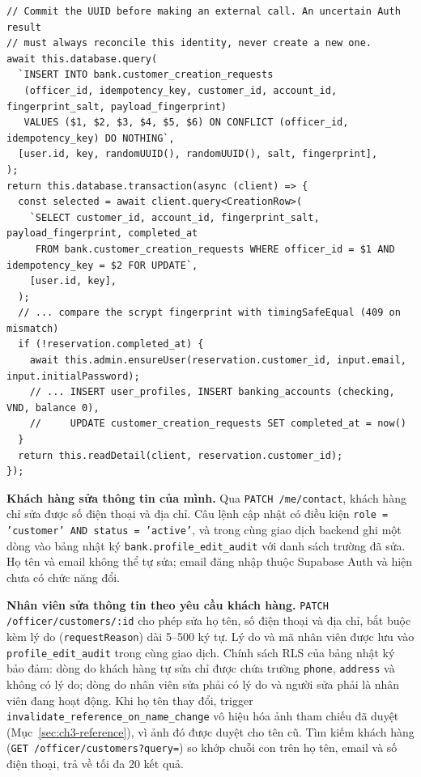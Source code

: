 \begin{lstlisting}[caption={Đặt chỗ yêu cầu tạo khách hàng trước khi gọi Supabase Auth (\texttt{customers.\allowbreak{}service.\allowbreak{}ts}, rút gọn)},label={lst:ch3-create}]
// Commit the UUID before making an external call. An uncertain Auth result
// must always reconcile this identity, never create a new one.
await this.database.query(
  `INSERT INTO bank.customer_creation_requests
   (officer_id, idempotency_key, customer_id, account_id, fingerprint_salt, payload_fingerprint)
   VALUES ($1, $2, $3, $4, $5, $6) ON CONFLICT (officer_id, idempotency_key) DO NOTHING`,
  [user.id, key, randomUUID(), randomUUID(), salt, fingerprint],
);
return this.database.transaction(async (client) => {
  const selected = await client.query<CreationRow>(
    `SELECT customer_id, account_id, fingerprint_salt, payload_fingerprint, completed_at
     FROM bank.customer_creation_requests WHERE officer_id = $1 AND idempotency_key = $2 FOR UPDATE`,
    [user.id, key],
  );
  // ... compare the scrypt fingerprint with timingSafeEqual (409 on mismatch)
  if (!reservation.completed_at) {
    await this.admin.ensureUser(reservation.customer_id, input.email, input.initialPassword);
    // ... INSERT user_profiles, INSERT banking_accounts (checking, VND, balance 0),
    //     UPDATE customer_creation_requests SET completed_at = now()
  }
  return this.readDetail(client, reservation.customer_id);
});
\end{lstlisting}

\textbf{Khách hàng sửa thông tin của mình.} Qua \texttt{PATCH /\allowbreak{}me/\allowbreak{}contact}, khách hàng chỉ sửa được số điện thoại và địa chỉ. Câu lệnh cập nhật có điều kiện \texttt{role = 'customer' AND status = 'active'}, và trong cùng giao dịch backend ghi một dòng vào bảng nhật ký \texttt{bank.\allowbreak{}profile\_\allowbreak{}edit\_\allowbreak{}audit} với danh sách trường đã sửa. Họ tên và email không thể tự sửa; email đăng nhập thuộc Supabase Auth và hiện chưa có chức năng đổi.

\textbf{Nhân viên sửa thông tin theo yêu cầu khách hàng.} \texttt{PATCH /\allowbreak{}officer/\allowbreak{}customers/\allowbreak{}:id} cho phép sửa họ tên, số điện thoại và địa chỉ, bắt buộc kèm lý do (\texttt{requestReason}) dài 5--500 ký tự. Lý do và mã nhân viên được lưu vào \texttt{profile\_\allowbreak{}edit\_\allowbreak{}audit} trong cùng giao dịch. Chính sách RLS của bảng nhật ký bảo đảm: dòng do khách hàng tự sửa chỉ được chứa trường \texttt{phone}, \texttt{address} và không có lý do; dòng do nhân viên sửa phải có lý do và người sửa phải là nhân viên đang hoạt động. Khi họ tên thay đổi, trigger \texttt{invalidate\_\allowbreak{}reference\_\allowbreak{}on\_\allowbreak{}name\_\allowbreak{}change} vô hiệu hóa ảnh tham chiếu đã duyệt (Mục~\ref{sec:ch3-reference}), vì ảnh đó được duyệt cho tên cũ. Tìm kiếm khách hàng (\texttt{GET /\allowbreak{}officer/\allowbreak{}customers?query=}) so khớp chuỗi con trên họ tên, email và số điện thoại, trả về tối đa 20 kết quả.

